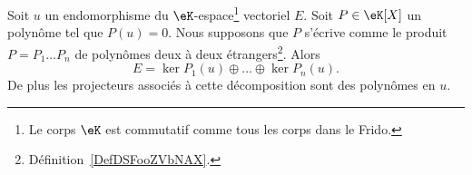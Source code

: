 \begin{theorem}       \label{ThoDecompNoyayzzMWod}
	Soit \( u\) un endomorphisme du \( \eK\)-espace\footnote{Le corps \( \eK\) est commutatif comme tous les corps dans le Frido.} vectoriel \( E\). Soit \( P\in\eK[X]\) un polynôme tel que \( P(u)=0\). Nous supposons que \( P\) s'écrive comme le produit \( P=P_1\ldots P_n\) de polynômes deux à deux étrangers\footnote{Définition~\ref{DefDSFooZVbNAX}.}. Alors
	\begin{equation}
		E=\ker P_1(u)\oplus\ldots\oplus\ker P_n(u).
	\end{equation}
	De plus les projecteurs associés à cette décomposition sont des polynômes en \( u\).
\end{theorem}

